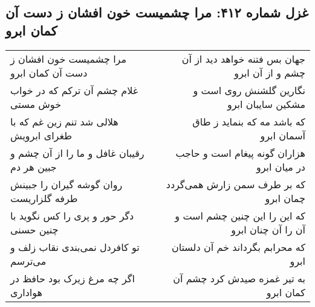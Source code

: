 \begin{center}
\section*{غزل شماره ۴۱۲: مرا چشمیست خون افشان ز دست آن کمان ابرو}
\label{sec:sh412}
\begin{longtable}{l p{0.5cm} r}
مرا چشمیست خون افشان ز دست آن کمان ابرو
&&
جهان بس فتنه خواهد دید از آن چشم و از آن ابرو
\\
غلام چشم آن ترکم که در خواب خوش مستی
&&
نگارین گلشنش روی است و مشکین سایبان ابرو
\\
هلالی شد تنم زین غم که با طغرای ابرویش
&&
که باشد مه که بنماید ز طاق آسمان ابرو
\\
رقیبان غافل و ما را از آن چشم و جبین هر دم
&&
هزاران گونه پیغام است و حاجب در میان ابرو
\\
روان گوشه گیران را جبینش طرفه گلزاریست
&&
که بر طرف سمن زارش همی‌گردد چمان ابرو
\\
دگر حور و پری را کس نگوید با چنین حسنی
&&
که این را این چنین چشم است و آن را آن چنان ابرو
\\
تو کافردل نمی‌بندی نقاب زلف و می‌ترسم
&&
که محرابم بگرداند خم آن دلستان ابرو
\\
اگر چه مرغ زیرک بود حافظ در هواداری
&&
به تیر غمزه صیدش کرد چشم آن کمان ابرو
\\
\end{longtable}
\end{center}

